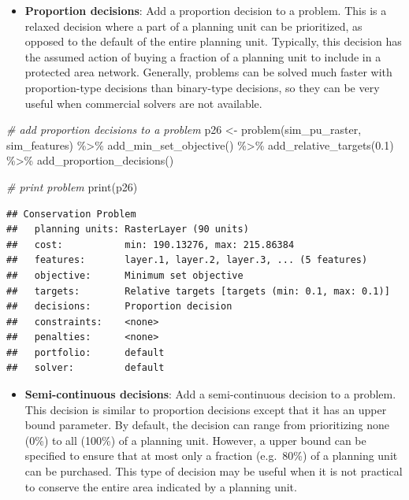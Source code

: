 \documentclass[
  12pt,
]{book}
\newenvironment{Shaded}{\begin{snugshade}}{\end{snugshade}}
\newcommand{\CommentTok}[1]{\textcolor[rgb]{0.56,0.35,0.01}{\textit{#1}}}
\newcommand{\FloatTok}[1]{\textcolor[rgb]{0.00,0.00,0.81}{#1}}
\newcommand{\FunctionTok}[1]{\textcolor[rgb]{0.00,0.00,0.00}{#1}}
\newcommand{\NormalTok}[1]{#1}
\newcommand{\OtherTok}[1]{\textcolor[rgb]{0.56,0.35,0.01}{#1}}
\newcommand{\SpecialCharTok}[1]{\textcolor[rgb]{0.00,0.00,0.00}{#1}}
\providecommand{\tightlist}{%
  \setlength{\itemsep}{0pt}\setlength{\parskip}{0pt}}
\begin{document}
\begin{itemize}
\tightlist
\item
  \textbf{Proportion decisions}: Add a proportion decision to a problem. This is a relaxed decision where a part of a planning unit can be prioritized, as opposed to the default of the entire planning unit. Typically, this decision has the assumed action of buying a fraction of a planning unit to include in a protected area network. Generally, problems can be solved much faster with proportion-type decisions than binary-type decisions, so they can be very useful when commercial solvers are not available.
\end{itemize}

\begin{Shaded}
\begin{Highlighting}[]
\CommentTok{\# add proportion decisions to a problem}
\NormalTok{p26 }\OtherTok{\textless{}{-}} \FunctionTok{problem}\NormalTok{(sim\_pu\_raster, sim\_features) }\SpecialCharTok{\%\textgreater{}\%}
       \FunctionTok{add\_min\_set\_objective}\NormalTok{() }\SpecialCharTok{\%\textgreater{}\%}
       \FunctionTok{add\_relative\_targets}\NormalTok{(}\FloatTok{0.1}\NormalTok{) }\SpecialCharTok{\%\textgreater{}\%}
       \FunctionTok{add\_proportion\_decisions}\NormalTok{()}

\CommentTok{\# print problem}
\FunctionTok{print}\NormalTok{(p26)}
\end{Highlighting}
\end{Shaded}

\begin{verbatim}
## Conservation Problem
##   planning units: RasterLayer (90 units)
##   cost:           min: 190.13276, max: 215.86384
##   features:       layer.1, layer.2, layer.3, ... (5 features)
##   objective:      Minimum set objective 
##   targets:        Relative targets [targets (min: 0.1, max: 0.1)]
##   decisions:      Proportion decision 
##   constraints:    <none>
##   penalties:      <none>
##   portfolio:      default
##   solver:         default
\end{verbatim}

\begin{itemize}
\tightlist
\item
  \textbf{Semi-continuous decisions}: Add a semi-continuous decision to a problem. This decision is similar to proportion decisions except that it has an upper bound parameter. By default, the decision can range from prioritizing none (0\%) to all (100\%) of a planning unit. However, a upper bound can be specified to ensure that at most only a fraction (e.g.~80\%) of a planning unit can be purchased. This type of decision may be useful when it is not practical to conserve the entire area indicated by a planning unit.
\end{itemize}
\end{document}
